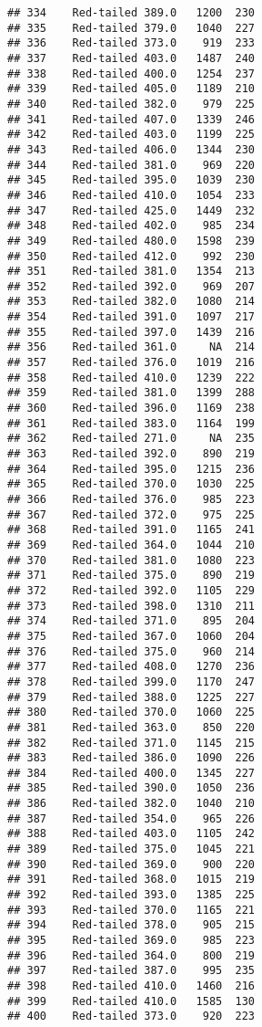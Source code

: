 \documentclass[
]{article}
\begin{document}
\begin{verbatim}
## 334    Red-tailed 389.0   1200  230
## 335    Red-tailed 379.0   1040  227
## 336    Red-tailed 373.0    919  233
## 337    Red-tailed 403.0   1487  240
## 338    Red-tailed 400.0   1254  237
## 339    Red-tailed 405.0   1189  210
## 340    Red-tailed 382.0    979  225
## 341    Red-tailed 407.0   1339  246
## 342    Red-tailed 403.0   1199  225
## 343    Red-tailed 406.0   1344  230
## 344    Red-tailed 381.0    969  220
## 345    Red-tailed 395.0   1039  230
## 346    Red-tailed 410.0   1054  233
## 347    Red-tailed 425.0   1449  232
## 348    Red-tailed 402.0    985  234
## 349    Red-tailed 480.0   1598  239
## 350    Red-tailed 412.0    992  230
## 351    Red-tailed 381.0   1354  213
## 352    Red-tailed 392.0    969  207
## 353    Red-tailed 382.0   1080  214
## 354    Red-tailed 391.0   1097  217
## 355    Red-tailed 397.0   1439  216
## 356    Red-tailed 361.0     NA  214
## 357    Red-tailed 376.0   1019  216
## 358    Red-tailed 410.0   1239  222
## 359    Red-tailed 381.0   1399  288
## 360    Red-tailed 396.0   1169  238
## 361    Red-tailed 383.0   1164  199
## 362    Red-tailed 271.0     NA  235
## 363    Red-tailed 392.0    890  219
## 364    Red-tailed 395.0   1215  236
## 365    Red-tailed 370.0   1030  225
## 366    Red-tailed 376.0    985  223
## 367    Red-tailed 372.0    975  225
## 368    Red-tailed 391.0   1165  241
## 369    Red-tailed 364.0   1044  210
## 370    Red-tailed 381.0   1080  223
## 371    Red-tailed 375.0    890  219
## 372    Red-tailed 392.0   1105  229
## 373    Red-tailed 398.0   1310  211
## 374    Red-tailed 371.0    895  204
## 375    Red-tailed 367.0   1060  204
## 376    Red-tailed 375.0    960  214
## 377    Red-tailed 408.0   1270  236
## 378    Red-tailed 399.0   1170  247
## 379    Red-tailed 388.0   1225  227
## 380    Red-tailed 370.0   1060  225
## 381    Red-tailed 363.0    850  220
## 382    Red-tailed 371.0   1145  215
## 383    Red-tailed 386.0   1090  226
## 384    Red-tailed 400.0   1345  227
## 385    Red-tailed 390.0   1050  236
## 386    Red-tailed 382.0   1040  210
## 387    Red-tailed 354.0    965  226
## 388    Red-tailed 403.0   1105  242
## 389    Red-tailed 375.0   1045  221
## 390    Red-tailed 369.0    900  220
## 391    Red-tailed 368.0   1015  219
## 392    Red-tailed 393.0   1385  225
## 393    Red-tailed 370.0   1165  221
## 394    Red-tailed 378.0    905  215
## 395    Red-tailed 369.0    985  223
## 396    Red-tailed 364.0    800  219
## 397    Red-tailed 387.0    995  235
## 398    Red-tailed 410.0   1460  216
## 399    Red-tailed 410.0   1585  130
## 400    Red-tailed 373.0    920  223

\end{verbatim}
\end{document}
